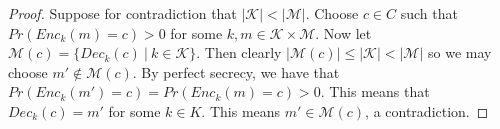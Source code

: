 \documentclass[twoside, a4paper, 10pt]{amsart}
\begin{document}
\begin{proof} Suppose for contradiction that $|\mathcal{K}| < |\mathcal{M}|$. Choose $c \in C$ such that $Pr(Enc_k(m) = c) > 0$ for some $k,m \in \mathcal{K} \times \mathcal{M}$. Now let $\mathcal{M}(c) = \{ Dec_k(c) ~|~ k \in \mathcal{K} \}$. Then clearly $|\mathcal{M}(c)| \leq |\mathcal{K}| < |\mathcal{M}|$ so we may choose $m' \notin \mathcal{M}(c)$. By perfect secrecy, we have that $Pr(Enc_k(m') = c) = Pr(Enc_k(m) = c) > 0$. This means that $Dec_k(c) = m'$ for some $k \in K$. This means $m' \in \mathcal{M}(c)$, a contradiction.\end{proof}
\end{document}
